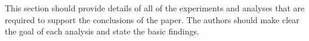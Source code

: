 \documentclass[a4paper,num-refs]{oup-contemporary}
\begin{document}
This section should provide details of all of the experiments and analyses that are required to support the conclusions of the paper. The authors should make clear the goal of each analysis and state the basic findings.



\end{document}
